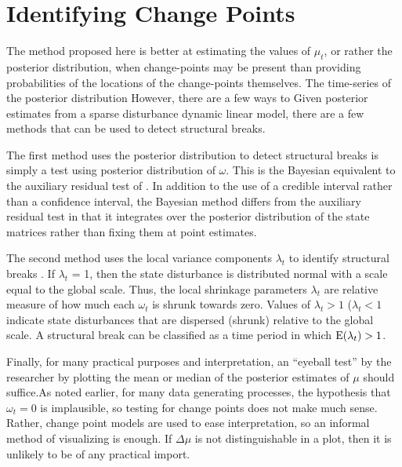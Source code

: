 \section{Identifying Change Points}
\label{dlm:sec:ident-change-points}

The method proposed here is better at estimating the values of $\mu_{t}$, or rather the posterior distribution, when change-points may be present than providing probabilities of the locations of the change-points themselves.
The time-series of the posterior distribution 
However, there are a few ways to Given posterior estimates from a sparse disturbance dynamic linear model, there are a few methods that
can be used to detect structural breaks.

The first method uses the posterior distribution to detect structural breaks is simply a test using posterior distribution of $\omega$.
This is the Bayesian equivalent to the auxiliary residual test of \textcite{DeJongPenzer1998}.
In addition to the use of a credible interval rather than a confidence interval, the Bayesian method differs from the auxiliary residual test in that it integrates over the posterior distribution of the state matrices rather than fixing them at point estimates.

The second method uses the local variance components $\lambda_{t}$ to identify structural breaks \parencite[179-180]{PetrisPetroneEtAl2009}.
If $\lambda_{t}$ = 1, then the state disturbance is distributed normal with a scale equal to the global scale.
Thus, the local shrinkage parameters $\lambda_{t}$ are relative measure of how much each $\omega_{t}$ is shrunk towards zero.
Values of $\lambda_{t} > 1$ ($\lambda_{t} < 1$ indicate state disturbances that are dispersed (shrunk) relative to the global scale.
A structural break can be classified as a time period in which $\operatorname{E}(\lambda_{t}) > 1$.


Finally, for many practical purposes and interpretation, an ``eyeball test'' by the researcher by plotting the mean or median of the posterior estimates of $\mu$ should suffice.As noted earlier, for many data generating processes, the hypothesis that $\omega_{t} = 0$ is implausible, so testing for change points does not make much sense.
Rather, change point models are used to ease interpretation, so an informal method of visualizing is enough.
If $\Delta \mu$ is not distinguishable in a plot, then it is unlikely to be of any practical import.

